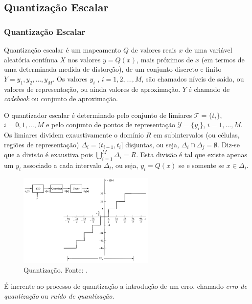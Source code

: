 \subsection{Quantização Escalar}
\begin{frame}[allowframebreaks]
  \frametitle{Quantização Escalar}

  Quantização escalar é um mapeamento $Q$ de valores reais $x$ de uma variável aleatória
  contínua $X$ nos valores $y = Q(x)$, mais próximos de $x$ (em termos de uma determinada medida de distorção),
  de um conjunto discreto e finito $Y = {y_1 , y_2 , \ldots,  y_M }$.
  Os valores $y_i$ , $i = 1, 2, \ldots , M$, são chamados níveis de saída, ou valores de representação,
  ou ainda valores de aproximação. $Y$ é chamado de \textit{codebook} ou conjunto de aproximação.

  \framebreak

  O quantizador escalar é determinado pelo conjunto de limiares 
  $\mathcal{T} = \{t_i\}$, $i=0, 1, \ldots, M$
  e pelo conjunto de pontos de representação $\mathcal{Y} = \{y_i\}$, $i=1, \ldots, M$. 
  Os limiares dividem exaustivamente o domínio $\mathit{R}$ em subintervalos 
  (ou células, regiões de representação) $\Delta_i = (t_{i-1} , t_i ]$ disjuntas,
  ou seja, $\Delta_i \cap \Delta_j = \emptyset$. Diz-se que a divisão é exaustiva
  pois $\bigcup_{i=1}^M \Delta_i = \mathit{R}$. Esta divisão é tal que existe apenas
  um $y_i$ associado a cada intervalo $\Delta_i$, ou seja, $y_i = Q(x)$ se e somente se
  $x \in \Delta_i$. 

  \framebreak 

  \begin{figure}[h!]
  \centering
  \includegraphics[width=0.6\textwidth]{images/quantization-oppenheim-fig447.png}
  \caption{Quantização. Fonte: \cite{oppenheim2009}.}
  \label{fig:quantization-fig447}
  \end{figure}  

  \framebreak

  É inerente ao processo de quantização a introdução de um erro, chamado \textit{erro de quantização}
  ou \textit{ruído de quantização}.


\end{frame}
